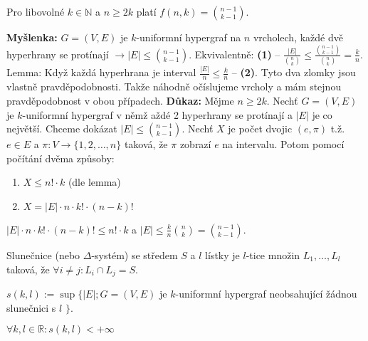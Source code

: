 \begin{veta}
	Pro libovolné $k \in \mathbb{N}$ a $n \geq 2k$ platí $f(n,k) = \binom{n-1}{k-1}$.
\end{veta}

\begin{dukaz}
	\textbf{Myšlenka:} $G = (V,E)$ je $k$-uniformní hypergraf na $n$ vrcholech, každé dvě hyperhrany se protínají $\to |E| \leq \binom{n-1}{k-1}$. Ekvivalentně: \textbf{(1)} -- $\frac{|E|}{\binom{n}{k}} \leq \frac{\binom{n-1}{k-1}}{\binom{n}{k}} = \frac{k}{n}$. Lemma: Když každá hyperhrana je interval $\frac{|E|}{n} \leq \frac{k}{n}$ -- \textbf{(2)}. Tyto dva zlomky jsou vlastně pravděpodobnosti. Takže náhodně očíslujeme vrcholy a mám stejnou pravděpodobnost v obou případech. \textbf{Důkaz:} Mějme $n \geq 2k$. Nechť $G= (V,E)$ je $k$-uniformní hypergraf v němž aždé 2 hyperhrany se protínají a $|E|$ je co největší. Chceme dokázat $|E| \leq \binom{n-1}{k-1}$. Nechť $X$ je počet dvojic $(e,\pi)$ t.ž. $e \in E$ a $\pi: V \to \{1,2,\dots,n\}$ taková, že $\pi$ zobrazí $e$ na intervalu. Potom pomocí počítání dvěma způsoby:
	
	\begin{enumerate}
		\item $X \leq n! \cdot k$ (dle lemma)
		\item $X = |E| \cdot n \cdot k! \cdot (n-k)!$
	\end{enumerate}
	
	$|E| \cdot n \cdot k! \cdot (n-k)! \leq n! \cdot k$ a $|E| \leq \frac{k}{n} \binom{n}{k} = \binom{n-1}{k-1}$.
\end{dukaz}

\begin{definice}
	Slunečnice (nebo $\Delta$-systém) se středem $S$ a $l$ lístky je $l$-tice množin $L_{1},\dots,L_{l}$ taková, že $\forall i \neq j: L_{i} \cap L_{j} = S$.
\end{definice}

\begin{definice}
	$s(k,l) := \sup \{|E|; G = (V,E)$ je $k$-uniformní hypergraf neobsahující žádnou slunečnici s  $l$ $\}$.
\end{definice}

\begin{veta}
	$\forall k,l \in \mathbb{R}: s(k,l) < + \infty$
\end{veta}

